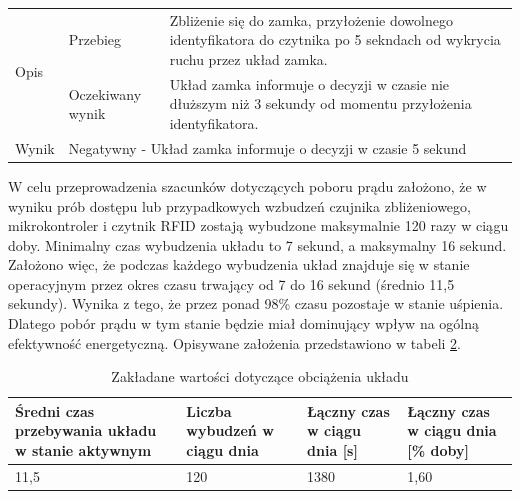 \begin{table}[h!]
\begin{subtable}[c]{\textwidth}
\begin{tabular}{p{2cm}|p{}|p{}}
                    \multirow{2}{*}{Opis} & Przebieg           & Zbliżenie się do zamka, przyłożenie dowolnego identyfikatora do czytnika po 5 sekndach od wykrycia ruchu przez układ zamka.  \\ \cline{2-3}
                                          & Oczekiwany wynik   & Układ zamka informuje o decyzji w czasie nie dłuższym niż 3 sekundy od momentu przyłożenia identyfikatora.                                                  \\ \hline
                    Wynik                 & \multicolumn{2}{p{12cm}}{Negatywny - Układ zamka informuje o decyzji w czasie 5 sekund} \\
                    \end{tabular}%
                \label{tbl:test6}
            \end{subtable}
            \label{tbl:tests}
        \end{table}

    \label{sec:wydajnosc}

        W celu przeprowadzenia szacunków dotyczących poboru prądu założono, że w wyniku prób dostępu lub przypadkowych wzbudzeń czujnika zbliżeniowego, mikrokontroler i czytnik RFID zostają wybudzone maksymalnie 120 razy w ciągu doby. Minimalny czas wybudzenia układu to 7 sekund, a maksymalny 16 sekund. Założono więc, że podczas każdego wybudzenia układ znajduje się w stanie operacyjnym przez okres czasu trwający od 7 do 16 sekund (średnio 11,5 sekundy). Wynika z tego, że przez ponad 98\% czasu pozostaje w stanie uśpienia. Dlatego pobór prądu w tym stanie będzie miał dominujący wpływ na ogólną efektywność energetyczną. Opisywane założenia przedstawiono w tabeli \ref{tbl:tab4}.

        \begin{table}[]
            \caption{Zakładane wartości dotyczące obciążenia układu}
            \centering
            \begin{tabular}{p{4cm}|p{3cm}|p{3cm}|p{3cm}}
                    \textbf{Średni czas przebywania układu w stanie aktywnym} & \textbf{Liczba wybudzeń w ciągu dnia} & \textbf{Łączny czas w ciągu dnia [s]} & \textbf{Łączny czas w ciągu dnia [\% doby]} \\ \hline
                     11,5 & 120 & 1380 & 1,60 \\
            \end{tabular}
            \label{tbl:tab4}
            \vspace{10mm}
        \end{table}

